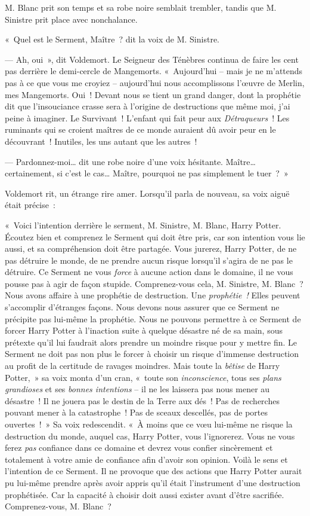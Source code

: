 M. Blanc prit son temps et sa robe noire semblait trembler, tandis que M. Sinistre prit place avec nonchalance.

«~Quel est le Serment, Maître~? dit la voix de M. Sinistre.

--- Ah, oui~», dit Voldemort.
Le Seigneur des Ténèbres continua de faire les cent pas derrière le demi-cercle de Mangemorts.
«~Aujourd'hui -- mais je ne m'attends pas à ce que vous me croyiez -- aujourd'hui nous accomplissons l'œuvre de Merlin, mes Mangemorts.
Oui~! Devant nous se tient un grand danger, dont la prophétie dit que l'insouciance crasse sera à l'origine de destructions que même moi, j'ai peine à imaginer.
Le Survivant~!
L'enfant qui fait peur aux \emph{Détraqueurs}~!
Les ruminants qui se croient maîtres de ce monde auraient dû avoir peur en le découvrant~!
Inutiles, les uns autant que les autres~!

--- Pardonnez-moi… dit une robe noire d'une voix hésitante.
Maître… certainement, si c'est le cas…
Maître, pourquoi ne pas simplement le tuer~?~»

Voldemort rit, un étrange rire amer.
Lorsqu'il parla de nouveau, sa voix aiguë était précise~:

«~Voici l'intention derrière le serment, M. Sinistre, M. Blanc, Harry Potter.
Écoutez bien et comprenez le Serment qui doit être pris, car son intention vous lie aussi, et sa compréhension doit être partagée.
Vous jurerez, Harry Potter, de ne pas détruire le monde, de ne prendre aucun risque lorsqu'il s'agira de ne pas le détruire.
Ce Serment ne vous \emph{force} à aucune action dans le domaine, il ne vous pousse pas à agir de façon stupide.
Comprenez-vous cela, M. Sinistre, M. Blanc~?
Nous avons affaire à une prophétie de destruction.
Une \emph{prophétie~!} Elles peuvent s'accomplir d'étranges façons.
Nous devons nous assurer que ce Serment ne précipite pas lui-même la prophétie.
Nous ne pouvons permettre à ce Serment de forcer Harry Potter à l'inaction suite à quelque désastre né de sa main, sous prétexte qu'il lui faudrait alors prendre un moindre risque pour y mettre fin.
Le Serment ne doit pas non plus le forcer à choisir un risque d'immense destruction au profit de la certitude de ravages moindres.
Mais toute la \emph{bêtise} de Harry Potter,~» sa voix monta d'un cran, «~toute son \emph{inconscience}, tous ses \emph{plans grandioses} et ses \emph{bonnes intentions} -- il ne les laissera pas nous mener au désastre~!
Il ne jouera pas le destin de la Terre aux dés~!
Pas de recherches pouvant mener à la catastrophe~!
Pas de sceaux descellés, pas de portes ouvertes~!~»
Sa voix redescendit.
«~À moins que ce vœu lui-même ne risque la destruction du monde, auquel cas, Harry Potter, vous l'ignorerez.
Vous ne vous ferez \emph{pas} confiance dans ce domaine et devrez vous confier sincèrement et totalement à votre amie de confiance afin d'avoir son opinion.
Voilà le sens et l'intention de ce Serment.
Il ne provoque que des actions que Harry Potter aurait pu lui-même prendre après avoir appris qu'il était l'instrument d'une destruction prophétisée.
Car la capacité à choisir doit aussi exister avant d'être sacrifiée.
Comprenez-vous, M. Blanc~?

